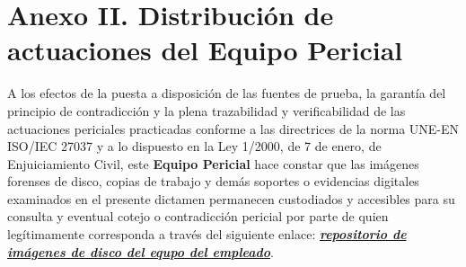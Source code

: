 \section*{Anexo II. Distribución de actuaciones del Equipo Pericial}

A los efectos de la puesta a disposición de las fuentes de prueba, la garantía del principio de contradicción y la plena trazabilidad y verificabilidad de las actuaciones periciales practicadas conforme a las directrices de la norma UNE-EN ISO/IEC 27037 y a lo dispuesto en la Ley 1/2000, de 7 de enero, de Enjuiciamiento Civil, este \textbf{Equipo Pericial \GrupoPracticas} hace constar que las imágenes forenses de disco, copias de trabajo y demás soportes o evidencias digitales examinados en el presente dictamen permanecen custodiados y accesibles para su consulta y eventual cotejo o contradicción pericial por parte de quien legítimamente corresponda a través del siguiente enlace: \href{https://uvaes-my.sharepoint.com/:f:/g/personal/alvaro_lopez_primo_estudiantes_uva_es/IgB5ujIrpTuxTJiIfg38X4QCAaf31MI4uyjjtGKrtgsyuvA?e=aJjbFz}{\textbf{\textit{repositorio de imágenes de disco del equpo del empleado}}}.